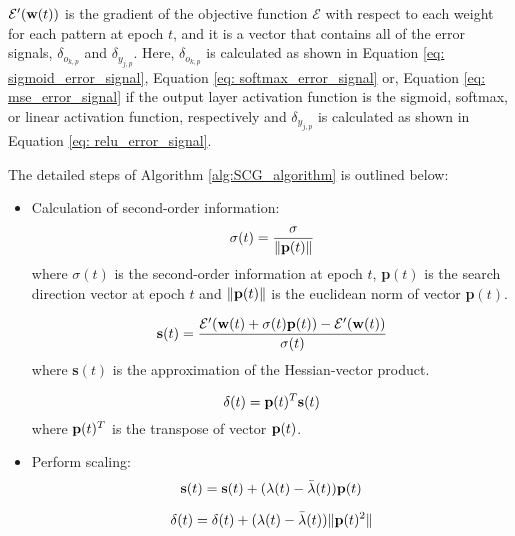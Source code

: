 \documentclass[10pt, conference]{IEEEtran}
\begin{document}
$\mathcal{E}'(\text{\textbf{w}}(t))$ is the gradient of the objective function $\mathcal{E}$ with respect to each weight for each
pattern at epoch $t$, and it is a vector that contains all of the error signals, $\delta_{o_{k,p}}$ and $\delta_{y_{j,p}}$. Here,
$\delta_{o_{k,p}}$ is calculated as shown in Equation \ref{eq: sigmoid_error_signal}, Equation \ref{eq: softmax_error_signal}
or, Equation \ref{eq: mse_error_signal} if the output layer activation function is the sigmoid, softmax, or linear activation
function, respectively and $\delta_{y_{j,p}}$ is calculated as shown in Equation \ref{eq: relu_error_signal}.

The detailed steps of Algorithm \ref{alg:SCG_algorithm} is outlined below:

\begin{itemize}
    \item Calculation of second-order information:
    \begin{equation}
        \sigma(t) = \frac{\sigma}{\| \text{\textbf{p}}(t) \|} \label{eq: sigma_t_second_order}
    \end{equation}
    where $\sigma(t)$ is the second-order information at epoch $t$, \textbf{p}$(t)$ is the search direction vector
    at epoch $t$ and $\| \text{\textbf{p}}(t) \|$ is the euclidean norm of vector \textbf{p}$(t)$.
    
    \begin{equation}
        \text{\textbf{s}}(t) = \frac{\mathcal{E}'(\text{\textbf{w}}(t) + \sigma(t)\text{\textbf{p}}(t)) - \mathcal{E}'(\text{\textbf{w}}(t))}{\sigma(t)} \label{eq: s_t_second_order}
    \end{equation}
    where \textbf{s}$(t)$ is the approximation of the Hessian-vector product.
    
    \begin{equation}
        \delta(t) = \text{\textbf{p}}(t)^T \text{\textbf{s}}(t) \label{eq: delta_t_second_order}
    \end{equation}
    where $\text{\textbf{p}}(t)^T$ is the transpose of vector $\text{\textbf{p}}(t)$.
    
    \item Perform scaling:
    \begin{equation}
        \text{\textbf{s}}(t) = \text{\textbf{s}}(t) + (\lambda(t) - \bar{\lambda}(t))\text{\textbf{p}}(t) \label{eq: scale_s}
    \end{equation}
    
    \begin{equation}
        \delta(t) = \delta(t) + (\lambda(t) - \bar{\lambda}(t)) \| \text{\textbf{p}}(t)^2 \| \label{eq: scale_delta}
    \end{equation}


\end{itemize}
\end{document}
